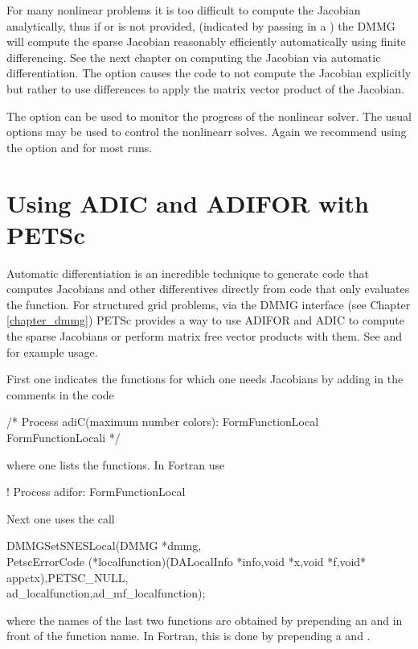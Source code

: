 For many nonlinear problems it is too difficult to compute the
Jacobian analytically, thus if  or  is not
provided, (indicated by passing in a ) the DMMG will compute the
sparse Jacobian reasonably efficiently automatically using finite
differencing. See the next chapter on computing the Jacobian via
automatic differentiation. The option 
causes the code to not compute the Jacobian explicitly but rather to
use differences to apply the matrix vector product of the Jacobian.

The option   can
be used to monitor the progress of the nonlinear solver. The usual  options
may be used to control the nonlinearr solves. Again we recommend using the 
option  and  for most runs.


\cleardoublepage
\chapter{Using ADIC and ADIFOR with PETSc}

Automatic differentiation is an incredible technique to generate code
that computes Jacobians and other differentives directly from code
that only evaluates the function. For structured grid problems, via
the DMMG interface (see Chapter \ref{chapter_dmmg}) PETSc provides a way to use
ADIFOR and ADIC to compute the sparse Jacobians or perform matrix free
vector products with them. See
 and  for example
usage. 

First one indicates the functions for which one needs Jacobians by adding
in the comments in the code 
\begin{tabbing}
       /* Process adiC(maximum number colors): FormFunctionLocal FormFunctionLocali */
\end{tabbing}
where one lists the functions. In Fortran use
\begin{tabbing}
!     Process adifor: FormFunctionLocal
\end{tabbing}
Next one uses the call
\begin{tabbing}
  DMMGSetSNESLocal(DMMG *dmmg,\\
   PetscErrorCode (*localfunction)(DALocalInfo *info,void *x,void *f,void* appctx),PETSC\_NULL,\\
  ad\_localfunction,ad\_mf\_localfunction);
\end{tabbing}
where the names of the last two functions are obtained 
by prepending an  and  in front
of the function name. In Fortran, this is done by prepending a  and .


